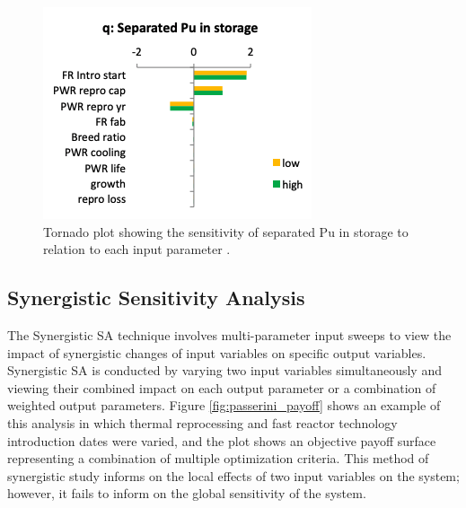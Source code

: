 \begin{figure}[]
	\begin{center}
		\includegraphics[scale=0.65]{./figures/oecd-tornado.png}
	\end{center}	
		\caption{Tornado plot showing the sensitivity of separated Pu in 
		storage to relation to each input parameter \cite{noauthor_effects_2017}.}
	\label{fig:oecd-tornado}
\end{figure}

\subsection{Synergistic Sensitivity Analysis}
The Synergistic \gls{SA} technique involves multi-parameter 
input sweeps to view the impact of synergistic 
changes of input variables on specific output variables. 
Synergistic \gls{SA} is conducted by varying 
two input variables simultaneously and viewing their 
combined impact on each output parameter or a combination 
of weighted output parameters. 
Figure \ref{fig:passerini_payoff} shows an example of this analysis 
in which thermal reprocessing and fast reactor technology 
introduction dates were varied, and the plot shows an objective 
payoff surface representing a combination of multiple optimization 
criteria. 
This method of synergistic study informs on the local effects of 
two input variables on the system; however, it fails to inform 
on the global sensitivity of the system. 

